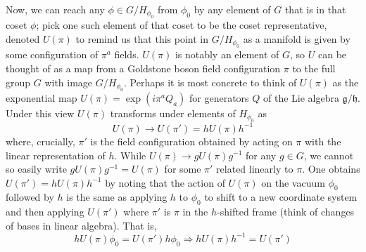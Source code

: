 \documentclass{report}
\begin{document}
Now, we can reach any $ \phi \in G/H_{\phi_0} $ from $ \phi_0 $ by any element of 
$ G $ that is in that coset $ \phi $; pick one such element of that coset to be 
the coset representative, denoted $ U(\pi) $ to remind us that this point in 
$ G/H_{\phi_0} $ as a manifold is given by some configuration of $ \pi^a $
fields. $ U(\pi) $ is notably an element of $ G $, so $ U $ can be thought of 
as a map from a Goldstone boson field configuration $ \pi $ to the full group 
$ G $ with image $ G/H_{\phi_0} $. Perhaps it is most concrete to think of 
$ U(\pi) $ as the exponential map $ U(\pi) = \exp(i\pi^a Q_a) $ for generators 
$ Q $ of the Lie algebra $ \mathfrak{g}/\mathfrak{h} $. Under this view 
$ U(\pi) $ transforms under elements of $ H_{\phi_0} $ as 
\begin{equation*}
	U(\pi) \to U(\pi') = hU(\pi) h^{-1}
\end{equation*}
where, crucially, $ \pi' $ is the field configuration obtained by acting on $ \pi $ with the 
linear representation of $ h $. While $ U(\pi) \to g U(\pi) g^{-1} $ for any 
$ g\in G $, we cannot so easily write $ gU(\pi) g^{-1} = U(\pi)$ for some 
$ \pi' $ related linearly to $ \pi $. One obtains $ U(\pi') = hU(\pi) h^{-1} $
by noting that the action of $ U(\pi) $ on the vacuum $ \phi_0 $ followed by 
$ h $ is the same as applying $ h $ to $ \phi_0 $ to shift to a new coordinate 
system and then applying $ U(\pi') $ where $ \pi' $ is $ \pi $ in the $ h
$-shifted frame (think of changes of bases in linear algebra). That is, 
\begin{equation*}
	h U(\pi) \phi_0 = U(\pi') h \phi_0 \Longrightarrow 
	hU(\pi)h^{-1} = U(\pi')
\end{equation*}
\end{document}
